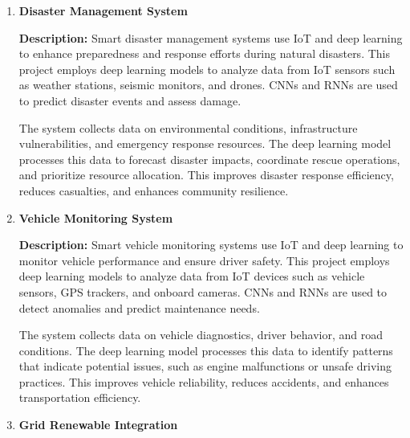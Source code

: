 \documentclass{article}
\begin{document}
\begin{enumerate}[label=\textbf{\arabic*.}, leftmargin=*]
\vspace{24pt} %
\item \textbf{Disaster Management System}

\textbf{Description:}
Smart disaster management systems use IoT and deep learning to enhance preparedness and response efforts during natural disasters. This project employs deep learning models to analyze data from IoT sensors such as weather stations, seismic monitors, and drones. CNNs and RNNs are used to predict disaster events and assess damage.

The system collects data on environmental conditions, infrastructure vulnerabilities, and emergency response resources. The deep learning model processes this data to forecast disaster impacts, coordinate rescue operations, and prioritize resource allocation. This improves disaster response efficiency, reduces casualties, and enhances community resilience.



\vspace{24pt} %
\item \textbf{Vehicle Monitoring System}

\textbf{Description:}
Smart vehicle monitoring systems use IoT and deep learning to monitor vehicle performance and ensure driver safety. This project employs deep learning models to analyze data from IoT devices such as vehicle sensors, GPS trackers, and onboard cameras. CNNs and RNNs are used to detect anomalies and predict maintenance needs.

The system collects data on vehicle diagnostics, driver behavior, and road conditions. The deep learning model processes this data to identify patterns that indicate potential issues, such as engine malfunctions or unsafe driving practices. This improves vehicle reliability, reduces accidents, and enhances transportation efficiency.



\vspace{24pt} %
\item \textbf{Grid Renewable Integration}


\end{enumerate}
\end{document}

